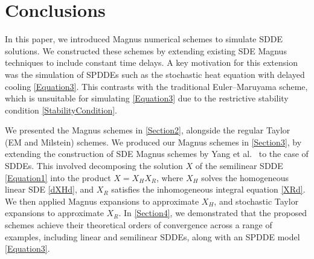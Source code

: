 \documentclass[onefignum]{siamart250211}
\begin{document}
\begin{example}
%
%



\end{example}













\section{Conclusions}\label{Section5}


In this paper, we introduced Magnus numerical schemes to simulate SDDE solutions. We constructed these schemes by extending existing SDE Magnus techniques to include constant time delays. A key motivation for this extension was the simulation of SPDDEs such as the stochastic heat equation with delayed cooling \cref{Equation3}. This contrasts with the traditional Euler–Maruyama scheme,
which is unsuitable for simulating \cref{Equation3} due to the restrictive stability condition \cref{StabilityCondition}.


We presented the Magnus schemes in \cref{Section2}, alongside the regular Taylor (EM and Milstein) schemes. We produced our Magnus schemes in \cref{Section3}, by extending the construction of SDE Magnus schemes by Yang et al.\ \cite{BurrageBurrage2021} to the case of SDDEs. This involved decomposing the solution $X$ of the semilinear SDDE \cref{Equation1} into the product $X=X_HX_R$, where $X_H$ solves the homogeneous linear SDE \cref{dXHd}, and $X_R$ satisfies the inhomogeneous integral equation \cref{XRd}. We then applied Magnus expansions to approximate $X_H$, and stochastic Taylor expansions to approximate $X_R$. In \cref{Section4}, we demonstrated that the proposed schemes achieve their theoretical orders of convergence across a range of examples, including linear and semilinear SDDEs, along with an SPDDE model \cref{Equation3}.
\end{document}
